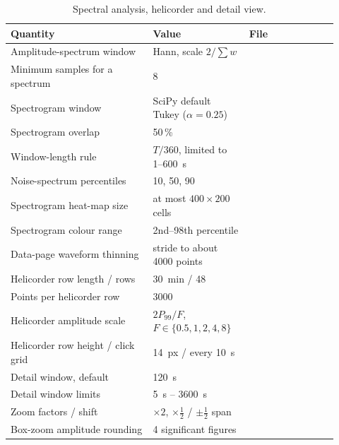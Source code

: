 \begin{table}[tbp]
\centering\small
\caption{Spectral analysis, helicorder and detail view.}\label{tab:paramB}
\begin{tabular}{@{}L{0.40\linewidth}L{0.27\linewidth}L{0.25\linewidth}@{}}
\toprule
Quantity & Value & File\\ \midrule
Amplitude-spectrum window & Hann, scale $2/\sum w$ & \\
Minimum samples for a spectrum & 8 & \\
Spectrogram window & SciPy default Tukey ($\alpha=0.25$) & \\
Spectrogram overlap & 50\,\% & \\
Window-length rule & $T/360$, limited to 1--600~s & \\
Noise-spectrum percentiles & 10, 50, 90 & \\
Spectrogram heat-map size & at most $400\times200$ cells & \\
Spectrogram colour range & 2nd--98th percentile & \\
Data-page waveform thinning & stride to about 4000 points & \\
Helicorder row length / rows & 30~min / 48 & \\
Points per helicorder row & 3000 & \\
Helicorder amplitude scale & $2P_{99}/F$, $F\in\{0.5,1,2,4,8\}$ & \\
Helicorder row height / click grid & 14~px / every 10~s & \\
Detail window, default & 120~s & \\
Detail window limits & 5~s -- 3600~s & \\
Zoom factors / shift & $\times2$, $\times\tfrac12$ / $\pm\tfrac12$ span & \\
Box-zoom amplitude rounding & 4 significant figures & \\
\bottomrule
\end{tabular}
\end{table}


